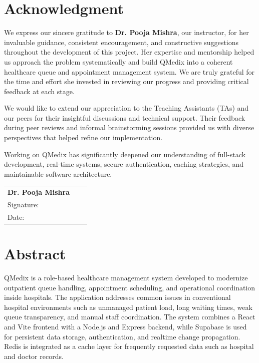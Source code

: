 \documentclass[12pt,onecolumn]{IEEEtran}
\let\oldsection\section
\renewcommand{\section}{\clearpage\oldsection}
\begin{document}
\section*{Acknowledgment}
We express our sincere gratitude to \textbf{Dr. Pooja Mishra}, our instructor, for her invaluable guidance, consistent encouragement, and constructive suggestions throughout the development of this project. Her expertise and mentorship helped us approach the problem systematically and build QMedix into a coherent healthcare queue and appointment management system. We are truly grateful for the time and effort she invested in reviewing our progress and providing critical feedback at each stage.

We would like to extend our appreciation to the Teaching Assistants (TAs) and our peers for their insightful discussions and technical support. Their feedback during peer reviews and informal brainstorming sessions provided us with diverse perspectives that helped refine our implementation.

Working on QMedix has significantly deepened our understanding of full-stack development, real-time systems, secure authentication, caching strategies, and maintainable software architecture.

\vspace{2.2cm}
\noindent
\begin{tabular}{p{6cm}p{1cm}p{6cm}}
    \textbf{Dr. Pooja Mishra} \\[0.2cm]
    Signature: \underline{\hspace{4cm}}
    \\
    Date: \underline{\hspace{4.4cm}} \\
\end{tabular}

\section*{Abstract}
QMedix is a role-based healthcare management system developed to modernize outpatient queue handling, appointment scheduling, and operational coordination inside hospitals. The application addresses common issues in conventional hospital environments such as unmanaged patient load, long waiting times, weak queue transparency, and manual staff coordination. The system combines a React and Vite frontend with a Node.js and Express backend, while Supabase is used for persistent data storage, authentication, and realtime change propagation. Redis is integrated as a cache layer for frequently requested data such as hospital and doctor records.
\end{document}

